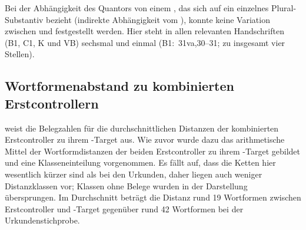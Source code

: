 Bei der Abhängigkeit des Quantors von einem , das sich
auf ein einzelnes Plural-Substantiv bezieht (indirekte Abhängigkeit vom
), konnte keine Variation zwischen  und 
festgestellt werden. Hier steht in allen relevanten Handschriften (B1, C1, K
und VB) sechsmal  und einmal  (B1:~31va,30--31; zu
insgesamt vier Stellen).


\subsection{Wortformenabstand zu kombinierten Erstcontrollern}

 weist die Belegzahlen für die durchschnittlichen
Distanzen der kombinierten Erstcontroller zu ihrem -Target aus. Wie
zuvor wurde dazu das arithmetische Mittel der Wortformdistanzen der beiden
Erstcontroller zu ihrem -Target gebildet und eine
Klasseneinteilung vorgenommen. Es fällt auf, dass die
Ketten hier wesentlich kürzer sind als bei den
Urkunden, daher liegen auch weniger Distanzklassen vor; Klassen
ohne Belege wurden in der Darstellung übersprungen. Im Durchschnitt beträgt die
Distanz rund 19 Wortformen zwischen Erstcontroller und -Target
gegenüber rund 42 Wortformen bei der Urkundenstichprobe.

